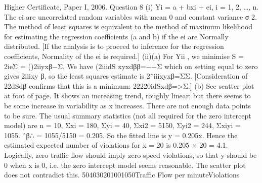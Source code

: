 Higher Certificate, Paper I, 2006. Question 8
(i) Yi = a + bxi + ei, i = 1, 2, …, n.
The {ei} are uncorrelated random variables with mean 0 and constant variance σ 2.
The method of least squares is equivalent to the method of maximum likelihood for estimating the regression coefficients (a and b) if the {ei} are Normally distributed.
[If the analysis is to proceed to inference for the regression coefficients, Normality of the {ei} is required.]
(ii)(a) For Yii , we minimise S = 2ieΣ = ()2iiyxβ−Σ.
We have (2iiidS xyxdββ=−−Σ which on setting equal to zero gives 2iiixy β, so the least squares estimate is 2ˆiiixyxβ=ΣΣ.
[Consideration of 22dSdβ confirms that this is a minimum: 22220idSxdβ=>Σ.]
(b) See scatter plot at foot of page. It shows an increasing trend, roughly linear; but there seems to be some increase in variability as x increases. There are not enough data points to be sure.
The usual summary statistics (not all required for the zero intercept model) are
n = 10, Σxi = 180, Σyi = 40, Σxi2 = 5150, Σyi2 = 244, Σxiyi = 1055.
ˆβ∴ =
1055/5150 =
0.205. So the fitted line is y
=
0.205x.
Hence the estimated expected number of violations for x = 20 is 0.205 × 20 = 4.1.
Logically, zero traffic flow should imply zero speed violations, so that y should be 0 when x is 0, i.e. the zero intercept model seems reasonable. The scatter plot does not contradict this.
504030201001050Traffic Flow per minuteViolations

